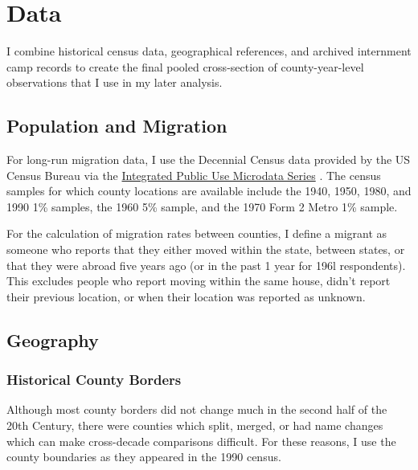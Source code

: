 \documentclass[12pt]{article}
\begin{document}
\section{Data}\label{data}

I combine historical census data, geographical references, and archived internment camp records to create the final pooled cross-section of county-year-level observations that I use in my later analysis. 

\subsection{Population and Migration}\label{population-and-migration}

For long-run migration data, I use the Decennial Census data provided by
the US Census Bureau via the
\href{https://usa.ipums.org/usa/index.shtml}{Integrated Public Use
Microdata Series} \citep{ruggles_ipums_2024}. The census
samples for which county locations are available include the 1940, 1950,
1980, and 1990 1\% samples, the 1960 5\% sample, and the 1970 Form 2
Metro 1\% sample.

For the calculation of migration rates between counties, I define a
migrant as someone who reports that they either moved within the state,
between states, or that they were abroad five years ago (or in the past
1 year for 196l respondents). This excludes people who report moving
within the same house, didn't report their previous location, or when their
location was reported as unknown.

\subsection{Geography}\label{geography}

\subsubsection{Historical County Borders}\label{historical-county-borders}

Although most county borders did not change much in the second half of
the 20th Century, there were counties which split, merged, or had name
changes which can make cross-decade comparisons difficult. For these
reasons, I use the county boundaries as they appeared in the 1990 census.

\end{document}
